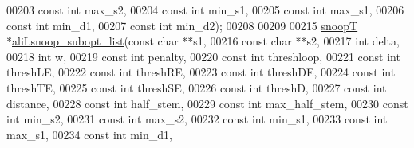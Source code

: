 \begin{DoxyCode}
00203                         \textcolor{keyword}{const} \textcolor{keywordtype}{int}   max\_s2,
00204                         \textcolor{keyword}{const} \textcolor{keywordtype}{int}   min\_s1,
00205                         \textcolor{keyword}{const} \textcolor{keywordtype}{int}   max\_s1,
00206                         \textcolor{keyword}{const} \textcolor{keywordtype}{int}   min\_d1,
00207                         \textcolor{keyword}{const} \textcolor{keywordtype}{int}   min\_d2);
00208 
00209 
00215 \mbox{\hyperlink{group__data__structures_structsnoop_t}{snoopT}} *\mbox{\hyperlink{snoop_8h_a492a454de232c152524fae59d23f2356}{aliLsnoop\_subopt\_list}}(\textcolor{keyword}{const} \textcolor{keywordtype}{char}  **s1,
00216                               \textcolor{keyword}{const} \textcolor{keywordtype}{char}  **s2,
00217                               \textcolor{keywordtype}{int}         delta,
00218                               \textcolor{keywordtype}{int}         w,
00219                               \textcolor{keyword}{const} \textcolor{keywordtype}{int}   penalty,
00220                               \textcolor{keyword}{const} \textcolor{keywordtype}{int}   threshloop,
00221                               \textcolor{keyword}{const} \textcolor{keywordtype}{int}   threshLE,
00222                               \textcolor{keyword}{const} \textcolor{keywordtype}{int}   threshRE,
00223                               \textcolor{keyword}{const} \textcolor{keywordtype}{int}   threshDE,
00224                               \textcolor{keyword}{const} \textcolor{keywordtype}{int}   threshTE,
00225                               \textcolor{keyword}{const} \textcolor{keywordtype}{int}   threshSE,
00226                               \textcolor{keyword}{const} \textcolor{keywordtype}{int}   threshD,
00227                               \textcolor{keyword}{const} \textcolor{keywordtype}{int}   distance,
00228                               \textcolor{keyword}{const} \textcolor{keywordtype}{int}   half\_stem,
00229                               \textcolor{keyword}{const} \textcolor{keywordtype}{int}   max\_half\_stem,
00230                               \textcolor{keyword}{const} \textcolor{keywordtype}{int}   min\_s2,
00231                               \textcolor{keyword}{const} \textcolor{keywordtype}{int}   max\_s2,
00232                               \textcolor{keyword}{const} \textcolor{keywordtype}{int}   min\_s1,
00233                               \textcolor{keyword}{const} \textcolor{keywordtype}{int}   max\_s1,
00234                               \textcolor{keyword}{const} \textcolor{keywordtype}{int}   min\_d1,

\end{DoxyCode}
